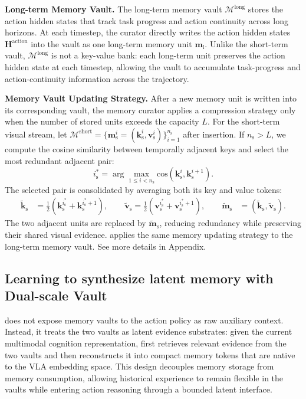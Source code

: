 \noindent\textbf{Long-term Memory Vault.}
The long-term memory vault $\mathcal{M}^\text{long}$ stores the action hidden states that track task progress and action continuity across long horizons.
At each timestep, the curator directly writes the action hidden states $\bm{H}^\text{action}$  into the vault as one long-term memory unit $\bm{m}_\text{l}$. Unlike the short-term vault, $\mathcal{M}^\text{long}$ is not a key-value bank:
each long-term unit preserves the action hidden state at each timestep, allowing the vault to accumulate task-progress and action-continuity information across the trajectory.

\noindent\textbf{Memory Vault Updating Strategy.}
After a new memory unit is written into its corresponding vault, the memory curator applies a compression strategy only when the number of stored units exceeds the capacity $L$.
For the short-term visual stream, let $\mathcal{M}^\text{short}=\{\bm{m}_\text{s}^i=(\bm{k}_\text{s}^i,\bm{v}_\text{s}^i)\}_{i=1}^{n_\text{s}}$ after insertion.
If $n_\text{s}>L$, we compute the cosine similarity between temporally adjacent keys and select the most redundant adjacent pair:
\begin{equation}
    \label{eq:short_memory_capacity}
    i_\text{s}^* =
    \arg\max_{1 \le i < n_\text{s}}
    \mathrm{cos}(\bm{k}_\text{s}^i,\bm{k}_\text{s}^{i+1}).
\end{equation}
The selected pair is consolidated by averaging both its key and value tokens:
\begin{equation}
    \label{eq:short_memory_merge}
    \begin{aligned}
        \tilde{\bm{k}}_\text{s} &=
        \frac{1}{2}(\bm{k}_\text{s}^{i_\text{s}^*}+\bm{k}_\text{s}^{i_\text{s}^*+1}), \qquad
        \tilde{\bm{v}}_\text{s} =
        \frac{1}{2}(\bm{v}_\text{s}^{i_\text{s}^*}+\bm{v}_\text{s}^{i_\text{s}^*+1}), \qquad
        \tilde{\bm{m}}_\text{s} &= (\tilde{\bm{k}}_\text{s},\tilde{\bm{v}}_\text{s}).
    \end{aligned}
\end{equation}
The two adjacent units are replaced by $\tilde{\bm{m}}_\text{s}$, reducing redundancy while preserving their shared visual evidence. \ourmethod applies the same memory updating strategy to the long-term memory vault. See more details in Appendix.

\subsection{Learning to synthesize latent memory with Dual-scale Vault}
\label{sec:seeker}
\ourmethod does not expose memory vaults to the action policy as raw auxiliary context.
Instead, it treats the two vaults as latent evidence substrates: 
given the current multimodal cognition representation, \ourmethod first retrieves relevant evidence from the two vaults and then reconstructs it into compact memory tokens that are native to the VLA embedding space.
This design decouples memory storage from memory consumption, allowing historical experience to remain flexible in the vaults while entering action reasoning through a bounded latent interface.

